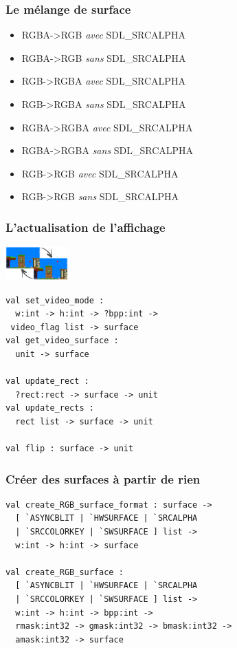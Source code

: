 \begin{frame}[fragile]
	\frametitle{Le mélange de surface}
	\scriptsize
	\begin{itemize}
		\item RGBA->RGB \textit{avec} SDL\_SRCALPHA 
		\item RGBA->RGB \textit{sans} SDL\_SRCALPHA
	\end{itemize}
	\begin{itemize}
		\item RGB->RGBA \textit{avec} SDL\_SRCALPHA
		\item RGB->RGBA \textit{sans} SDL\_SRCALPHA
	\end{itemize}
	\begin{itemize}
		\item RGBA->RGBA \textit{avec} SDL\_SRCALPHA
		\item RGBA->RGBA \textit{sans} SDL\_SRCALPHA
	\end{itemize}
	\begin{itemize}
		\item RGB->RGB \textit{avec} SDL\_SRCALPHA	
		\item RGB->RGB \textit{sans} SDL\_SRCALPHA
	\end{itemize}
\end{frame}

\begin{frame}[fragile]
	\frametitle{L'actualisation de l'affichage}
	\begin{center}
		\includegraphics[width=2.4cm]{pics/doubleBufferScreen.png}
	\end{center}
	\begin{lstlisting}
val set_video_mode : 
  w:int -> h:int -> ?bpp:int -> 
 video_flag list -> surface
val get_video_surface : 
  unit -> surface

val update_rect : 
  ?rect:rect -> surface -> unit
val update_rects : 
  rect list -> surface -> unit

val flip : surface -> unit
	\end{lstlisting}
\end{frame}

\begin{frame}[fragile]
	\frametitle{Créer des surfaces à partir de rien}
	\lstset{basicstyle=\footnotesize}
	\begin{lstlisting}
val create_RGB_surface_format : surface ->
  [ `ASYNCBLIT | `HWSURFACE | `SRCALPHA 
  | `SRCCOLORKEY | `SWSURFACE ] list ->
  w:int -> h:int -> surface

val create_RGB_surface : 
  [ `ASYNCBLIT | `HWSURFACE | `SRCALPHA 
  | `SRCCOLORKEY | `SWSURFACE ] list ->
  w:int -> h:int -> bpp:int ->
  rmask:int32 -> gmask:int32 -> bmask:int32 ->
  amask:int32 -> surface
	\end{lstlisting}
\end{frame}

